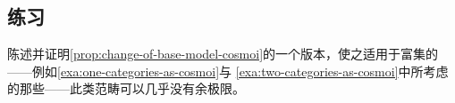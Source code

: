 \subsection*{练习}

\begin{exercise}\label{ex:enriched-fibrant-object-categories}
陈述并证明\cref{prop:change-of-base-model-cosmoi}的一个版本，使之适用于富集的%
\trCategoryOfFibrantObjects——例如\cref{exa:one-categories-as-cosmoi}与%
\cref{exa:two-categories-as-cosmoi}中所考虑的那些——此类范畴可以几乎没有余极限。
\end{exercise}

